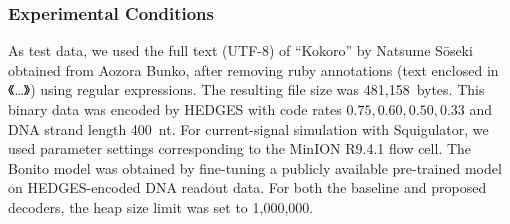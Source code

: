 \documentclass[sotsuron]{kuee}
\begin{document}
\subsubsection{Experimental Conditions}
As test data, we used the full text (UTF-8) of ``Kokoro'' by Natsume S\={o}seki obtained from Aozora Bunko,
after removing ruby annotations (text enclosed in 《…》) using regular expressions\cite{kokoro}.
The resulting file size was 481,158~bytes.
This binary data was encoded by HEDGES with code rates $0.75, 0.60, 0.50, 0.33$ and DNA strand length 400~nt.
For current-signal simulation with Squigulator, we used parameter settings corresponding to the MinION R9.4.1
flow cell\cite{squigulator}.
The Bonito model was obtained by fine-tuning a publicly available pre-trained model
on HEDGES-encoded DNA readout data\cite{bonito}.
For both the baseline and proposed decoders, the heap size limit was set to 1,000,000.
\end{document}
